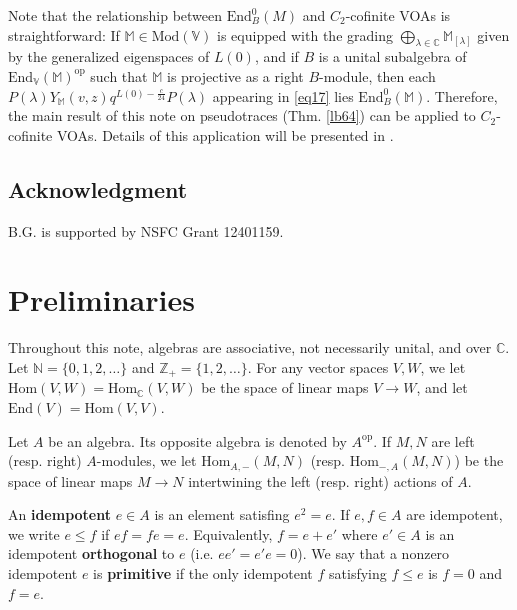 \documentclass[11pt,b5paper,notitlepage]{article}
\theoremstyle{definition}
\theoremstyle{plain}
\newcommand{\End}{\mathrm{End}} %
\newcommand{\Hom}{\mathrm{Hom}}
\newcommand{\opp}{\mathrm{op}}
\newcommand{\Vbb}{\mathbb V}
\newcommand{\Mbb}{\mathbb M}
\newcommand{\Cbb}{\mathbb C}
\newcommand{\Nbb}{\mathbb N}
\newcommand{\Zbb}{\mathbb Z}
\newcommand{\Mod}{\mathrm{Mod}}
\numberwithin{equation}{section}
\begin{document}
Note that the relationship between $\End^0_B(M)$ and $C_2$-cofinite VOAs is straightforward: If $\Mbb\in\Mod(\Vbb)$ is equipped with the grading $\bigoplus_{\lambda\in\Cbb}\Mbb_{[\lambda]}$ given by the generalized eigenspaces of $L(0)$, and if $B$ is a unital subalgebra of $\End_\Vbb(\Mbb)^\opp$ such that $\Mbb$ is projective as a right $B$-module, then each $P(\lambda)Y_\Mbb(v,z)q^{L(0)-\frac c{24}}P(\lambda)$ appearing in \eqref{eq17} lies $\End^0_B(\Mbb)$. Therefore, the main result of this note on pseudotraces (Thm. \ref{lb64}) can be applied to $C_2$-cofinite VOAs. Details of this application will be presented in \cite{GZ5}.



\subsection*{Acknowledgment}

B.G. is supported by NSFC Grant 12401159.



































\section{Preliminaries}

Throughout this note, algebras are associative, not necessarily unital, and over $\Cbb$. Let $\Nbb=\{0,1,2,\dots\}$ and $\Zbb_+=\{1,2,\dots\}$. For any vector spaces $V,W$, we let $\Hom(V,W)=\Hom_\Cbb(V,W)$ be the space of linear maps $V\rightarrow W$, and let $\End(V)=\Hom(V,V)$.

Let $A$ be an algebra. Its opposite algebra is denoted by $A^\opp$. If $M,N$ are left (resp. right) $A$-modules, we let $\Hom_{A,-}(M,N)$ (resp. $\Hom_{-,A}(M,N)$) be the space of linear maps $M\rightarrow N$ intertwining the left (resp. right) actions of $A$.

An \textbf{idempotent} $e\in A$ is an element satisfing $e^2=e$. If $e,f\in A$ are idempotent, we write $e\leq f$ if $ef=fe=e$. Equivalently, $f=e+e'$ where $e'\in A$ is an idempotent \textbf{orthogonal} to $e$ (i.e. $ee'=e'e=0$). We say that a nonzero idempotent $e$ is \textbf{primitive} if the only idempotent $f$ satisfying $f\leq e$ is $f=0$ and $f=e$.
\end{document}
